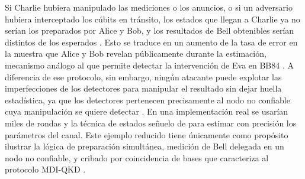 Si Charlie hubiera manipulado las mediciones o los anuncios, o si un adversario hubiera interceptado los cúbits en tránsito, los estados que llegan a Charlie ya no serían los preparados por Alice y Bob, y los resultados de Bell obtenibles serían distintos de los esperados \citep{lo2012,braunstein2012}. Esto se traduce en un aumento de la tasa de error en la muestra que Alice y Bob revelan públicamente durante la estimación, mecanismo análogo al que permite detectar la intervención de Eva en BB84 \citep{bennett1984}. A diferencia de ese protocolo, sin embargo, ningún atacante puede explotar las imperfecciones de los detectores para manipular el resultado sin dejar huella estadística, ya que los detectores pertenecen precisamente al nodo no confiable cuya manipulación se quiere detectar \citep{lo2012,lydersen2010}. En una implementación real se usarían miles de rondas y la técnica de estados señuelo de \cite{lo2005} para estimar con precisión los parámetros del canal. Este ejemplo reducido tiene únicamente como propósito ilustrar la lógica de preparación simultánea, medición de Bell delegada en un nodo no confiable, y cribado por coincidencia de bases que caracteriza al protocolo MDI-QKD \citep{lo2012}.